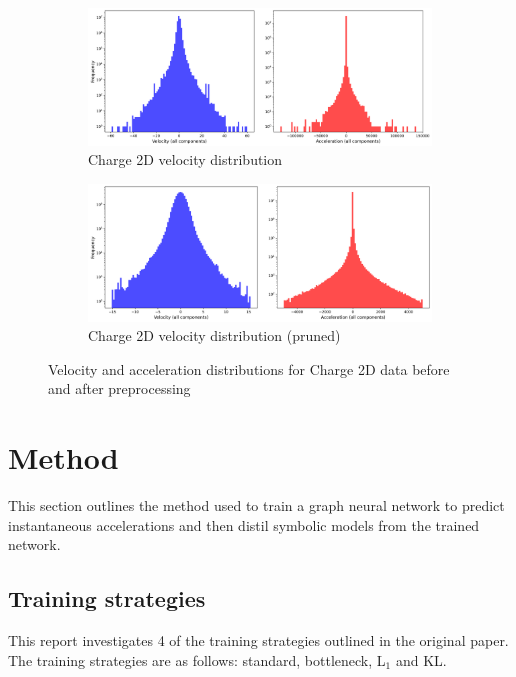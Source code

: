 \documentclass[11pt]{article}
\begin{document}
\begin{figure}[H]
    \centering
    \begin{subfigure}{0.9\textwidth}
        \includegraphics[width=\textwidth]{figs/charge_2_accel_vel_dist_unpruned.png}
        \caption{Charge 2D velocity distribution}
        \label{fig:charge_2_vel_dist_unpruned}
    \end{subfigure}
    \begin{subfigure}{0.9\textwidth}
        \includegraphics[width=\textwidth]{figs/charge_2_accel_vel_dist_pruned.png}
        \caption{Charge 2D velocity distribution (pruned)}
        \label{fig:charge_2_vel_dist_pruned}
    \end{subfigure}
    \caption{Velocity and acceleration distributions for Charge 2D data before and after preprocessing}
    \label{fig:distributions}
\end{figure}


\section{Method}
This section outlines the method used to train a graph neural network to predict instantaneous accelerations and then distil symbolic models from the trained network.
\subsection{Training strategies}
This report investigates 4 of the training strategies outlined in the original paper. The training strategies are as follows: standard, bottleneck, L$_1$ and KL. 
\end{document}
